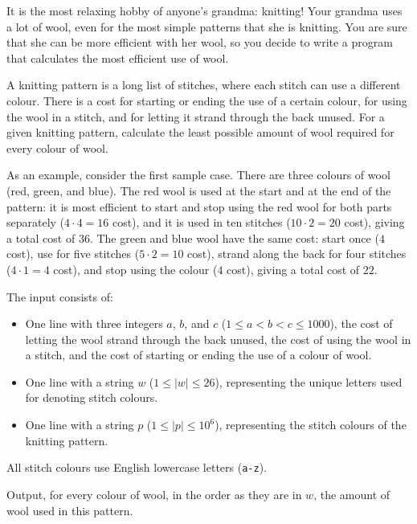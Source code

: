 

\newcommand{\maxa}{1000}
\newcommand{\maxp}{10^6}

It is the most relaxing hobby of anyone's grandma: knitting!
Your grandma uses a lot of wool,
even for the most simple patterns that she is knitting.
You are sure that she can be more efficient with her wool,
so you decide to write a program that calculates the most efficient use of wool.

A knitting pattern is a long list of stitches,
where each stitch can use a different colour.\footnotemark{}
There is a cost for starting or ending the use of a certain colour,
for using the wool in a stitch,
and for letting it strand through the back unused.
For a given knitting pattern,
calculate the least possible amount of wool required
for every colour of wool.


As an example, consider the first sample case.
There are three colours of wool (red, green, and blue).
The red wool is used at the start and at the end of the pattern:
it is most efficient to start and stop using the red wool for both parts separately ($4 \cdot 4 = 16$ cost),
and it is used in ten stitches ($10 \cdot 2 = 20$ cost),
giving a total cost of $36$.
The green and blue wool have the same cost:
start once ($4$ cost),
use for five stitches ($5 \cdot 2 = 10$ cost),
strand along the back for four stitches ($4 \cdot 1 = 4$ cost),
and stop using the colour ($4$ cost),
giving a total cost of $22$.

\begin{Input}
    The input consists of:
    \begin{itemize}
        \item One line with three integers $a$, $b$, and $c$ ($1\leq a < b < c\leq \maxa$),
            the cost of letting the wool strand through the back unused,
            the cost of using the wool in a stitch,
            and the cost of starting or ending the use of a colour of wool.
        \item One line with a string $w$ ($1 \leq |w| \leq 26$),
            representing the unique letters used for denoting stitch colours.
        \item One line with a string $p$ ($1 \leq |p| \leq \maxp$),
            representing the stitch colours of the knitting pattern.
    \end{itemize}
    All stitch colours use English lowercase letters (\texttt{a-z}).
\end{Input}

\begin{Output}
    Output, for every colour of wool, in the order as they are in $w$,
    the amount of wool used in this pattern.
\end{Output}

